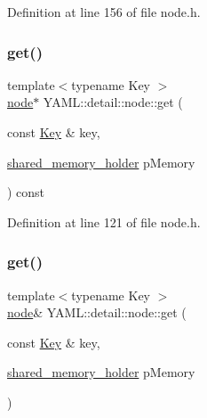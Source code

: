 Definition at line 156 of file node.\+h.

\mbox{\label{class_y_a_m_l_1_1detail_1_1node_a116a2f6dc7961f34fe6c363ebea91760}} 
\subsubsection{\texorpdfstring{get()}{get()}\hspace{0.1cm}{\footnotesize\ttfamily [1/4]}}
{\footnotesize\ttfamily template$<$typename Key $>$ \\
\mbox{\hyperlink{class_y_a_m_l_1_1detail_1_1node}{node}}$\ast$ Y\+A\+M\+L\+::detail\+::node\+::get (\begin{DoxyParamCaption}\item[{const \mbox{\hyperlink{namespace_y_a_m_l_a67c320aa50d3de7ecba1d0b8775dd684a1af533fc24b0311b8c4d5ac2870283aa}{Key}} \&}]{key,  }\item[{\mbox{\hyperlink{namespace_y_a_m_l_1_1detail_a228c4b3b6ba1058b474d40afc218e21d}{shared\+\_\+memory\+\_\+holder}}}]{p\+Memory }\end{DoxyParamCaption}) const\hspace{0.3cm}{\ttfamily [inline]}}



Definition at line 121 of file node.\+h.

\mbox{\label{class_y_a_m_l_1_1detail_1_1node_ab920aa2924623ffd11d82f6e1085556c}} 
\subsubsection{\texorpdfstring{get()}{get()}\hspace{0.1cm}{\footnotesize\ttfamily [2/4]}}
{\footnotesize\ttfamily template$<$typename Key $>$ \\
\mbox{\hyperlink{class_y_a_m_l_1_1detail_1_1node}{node}}\& Y\+A\+M\+L\+::detail\+::node\+::get (\begin{DoxyParamCaption}\item[{const \mbox{\hyperlink{namespace_y_a_m_l_a67c320aa50d3de7ecba1d0b8775dd684a1af533fc24b0311b8c4d5ac2870283aa}{Key}} \&}]{key,  }\item[{\mbox{\hyperlink{namespace_y_a_m_l_1_1detail_a228c4b3b6ba1058b474d40afc218e21d}{shared\+\_\+memory\+\_\+holder}}}]{p\+Memory }\end{DoxyParamCaption})\hspace{0.3cm}{\ttfamily [inline]}}



